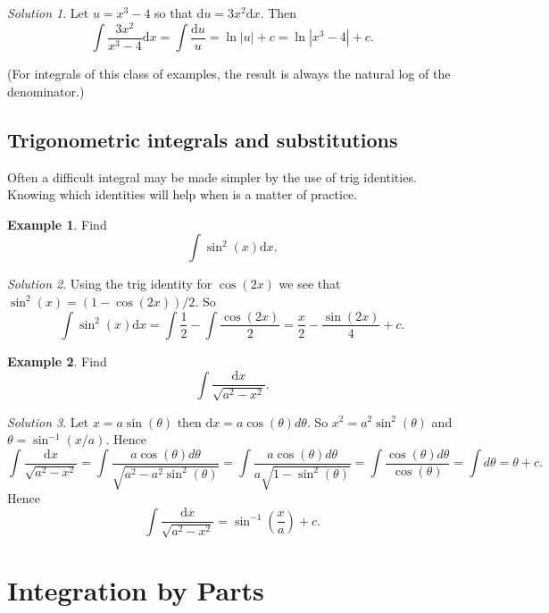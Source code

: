 \documentclass[
  english,
  11pt,
  oneside]{book}
\newcommand{\slide}{}
\newcommand{\ecpybx}{}
\theoremstyle{definition}
\theoremstyle{definition}
\newtheorem{example}{Example}[chapter]
\theoremstyle{definition}
\theoremstyle{definition}
\theoremstyle{remark}
\newtheorem*{solution}{Solution}
\begin{document}
\ecpybx\slide\copy\copybox

\begin{solution}
Let \(u = x^3-4\) so that \(\mathrm{d}u = 3x^2\mathrm{d}x\). Then
\[\int\frac{3x^2}{x^3-4}\mathrm{d}x = \int \frac{\mathrm{d}u}{u} = \ln|u|+c = \ln|x^3-4|+c.\]
\end{solution}

(For integrals of this class of examples, the result is always the natural log of the denominator.)
\slide

\subsection{Trigonometric integrals and substitutions}\label{trigonometric-integrals-and-substitutions}

Often a difficult integral may be made simpler by the use of trig identities. Knowing which identities will help when is a matter of practice.

\begin{example}
Find
\[\int\sin^2(x) \mathrm{d}x.\]
\end{example}

\begin{solution}
Using the trig identity for \(\cos(2x)\) we see that \(\sin^2(x) = (1-\cos(2x))/2\). So
\[\int\sin^2(x) \mathrm{d}x = \int\frac 12-\int\frac{\cos(2x)}{2} = \frac x2-\frac{\sin(2x)}{4}+c.\]
\end{solution}

\slide

\begin{example}
Find
\[\int\frac{\mathrm{d}x}{\sqrt{a^2-x^2}}.\]
\end{example}

\begin{solution}
Let \(x = a\sin(\theta)\) then \(\mathrm{d}x = a\cos(\theta)d\theta\). So \(x^2 = a^2\sin^2(\theta)\) and \(\theta = \sin^{-1}(x/a)\). Hence
\[\int\frac{\mathrm{d}x}{\sqrt{a^2-x^2}} = \int\frac{a\cos(\theta)d\theta}{\sqrt{a^2-a^2\sin^2(\theta)}} = \int\frac{a\cos(\theta)d\theta}{a\sqrt{1-\sin^2(\theta)}} = \int\frac{\cos(\theta)d\theta}{\cos(\theta)} = \int d\theta = \theta + c.\]
Hence
\[\int\frac{\mathrm{d}x}{\sqrt{a^2-x^2}} = \sin^{-1}\left(\frac xa\right) + c.\]
\end{solution}

\slide

\section{Integration by Parts}\label{integration-by-parts}
\end{document}
